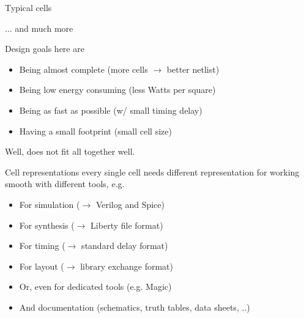 \documentclass[aspectratio=169]{beamer}
\begin{document}
\begin{frame}{Typical cells}
	\begin{figure}[h]
		\begin{center}
			\begin{circuitdiagram}{25}{25}
			\end{circuitdiagram}
		\end{center}
	\end{figure}

... and much more
\end{frame}

\begin{frame}{Design goals}
here are
	\begin{itemize}
        \setlength\itemsep{1em}
		\item Being almost complete (more cells $\rightarrow$ better netlist)
		\item Being low energy consuming (less Watts per square)
		\item Being as fast as possible (w/ small timing delay)
		\item Having a small footprint (small cell size)
	\end{itemize}

Well, does not fit all together well.
\end{frame}

\begin{frame}{Cell representations}
every single cell needs different representation for working smooth with different tools, e.g.
	\begin{itemize}
		\item For simulation ($\rightarrow$ Verilog and Spice)
		\item For synthesis ($\rightarrow$ Liberty file format)
		\item For timing ($\rightarrow$ standard delay format)
		\item For layout ($\rightarrow$ library exchange format)
		\item Or, even for dedicated tools (e.g. Magic)
		\item And documentation (schematics, truth tables, data sheets, ..)
	\end{itemize}
\end{frame}
\end{document}
